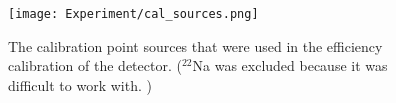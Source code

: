 

\begin{figure}
    \centering
    \texttt{[image: Experiment/cal\_sources.png]}
    \caption{The calibration point sources that were used in the efficiency calibration of the detector. ($^{22}$Na was excluded because it was difficult to work with. )}
    \label{fig:calsources}
\end{figure}

